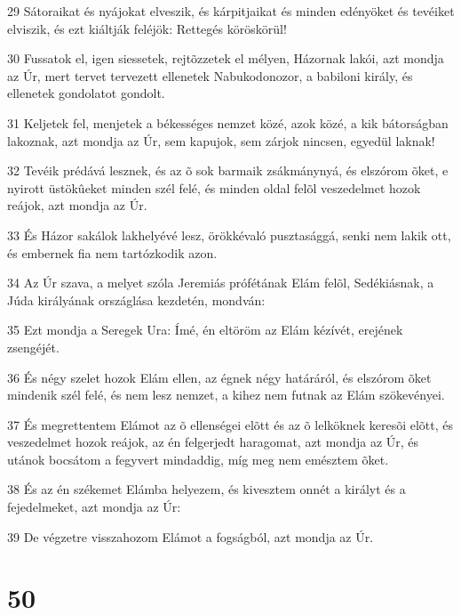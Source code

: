 \par 29 Sátoraikat és nyájokat elveszik, és kárpitjaikat és minden edényöket és tevéiket elviszik, és ezt kiáltják feléjök: Rettegés köröskörül!
\par 30 Fussatok el, igen siessetek, rejtõzzetek el mélyen, Házornak lakói, azt mondja az Úr, mert tervet tervezett ellenetek Nabukodonozor, a babiloni király, és ellenetek gondolatot gondolt.
\par 31 Keljetek fel, menjetek a békességes nemzet közé, azok közé, a kik bátorságban lakoznak, azt mondja az Úr, sem kapujok, sem zárjok nincsen, egyedül laknak!
\par 32 Tevéik prédává lesznek, és az õ sok barmaik zsákmánynyá, és elszórom õket, e nyirott üstökûeket minden szél felé, és minden oldal felõl veszedelmet hozok reájok, azt mondja az Úr.
\par 33 És Házor sakálok lakhelyévé lesz, örökkévaló pusztasággá, senki nem lakik ott, és embernek fia nem tartózkodik azon.
\par 34 Az Úr szava, a melyet szóla Jeremiás prófétának Elám felõl, Sedékiásnak, a Júda királyának országlása kezdetén, mondván:
\par 35 Ezt mondja a Seregek Ura: Ímé, én eltöröm az Elám kézívét, erejének zsengéjét.
\par 36 És négy szelet hozok Elám ellen, az égnek négy határáról, és elszórom õket mindenik szél felé, és nem lesz nemzet, a kihez nem futnak az Elám szökevényei.
\par 37 És megrettentem Elámot az õ ellenségei elõtt és az õ lelköknek keresõi elõtt, és veszedelmet hozok reájok, az én felgerjedt haragomat, azt mondja az Úr, és utánok bocsátom a fegyvert mindaddig, míg meg nem emésztem õket.
\par 38 És az én székemet Elámba helyezem, és kivesztem onnét a királyt és a fejedelmeket, azt mondja az Úr:
\par 39 De végzetre visszahozom Elámot a fogságból, azt mondja az Úr.

\chapter{50}

